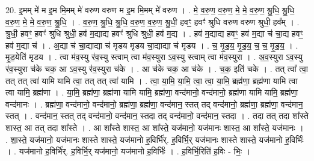 \documentclass[17pt]{extarticle}
\begin{document}
20. इ॒मम् मे॑ म इ॒म मि॒मम् मे॑ वरुण वरुण म इ॒म मि॒मम् मे॑ वरुण । . मे॒ व॒रु॒ण॒ व॒रु॒ण॒ मे॒ मे॒ व॒रु॒ण॒ श्रु॒धि॒ श्रु॒धि॒ व॒रु॒ण॒ मे॒ मे॒ व॒रु॒ण॒ श्रु॒धि॒ । . व॒रु॒ण॒ श्रु॒धि॒ श्रु॒धि॒ व॒रु॒ण॒ व॒रु॒ण॒ श्रु॒धी॒ हवꣳ॒॒ हवꣳ॑ श्रुधि वरुण वरुण श्रुधी॒ हव᳚म् । . श्रु॒धी॒ हवꣳ॒॒ हवꣳ॑ श्रुधि श्रुधी॒ हव॑ म॒द्याद्य हवꣳ॑ श्रुधि श्रुधी॒ हव॑ म॒द्य । . हव॑ म॒द्याद्य हवꣳ॒॒ हव॑ म॒द्या च॑ चा॒द्य हवꣳ॒॒ हव॑ म॒द्या च॑ । . अ॒द्या च॑ चा॒द्याद्या च॑ मृडय मृडय चा॒द्याद्या च॑ मृडय । . च॒ मृ॒ड॒य॒ मृ॒ड॒य॒ च॒ च॒ मृ॒ड॒य॒ । . मृ॒ड॒येति॑ मृडय । . त्वा म॑व॒स्यु र॑व॒स्यु स्त्वाम् त्वा म॑व॒स्युरा ऽव॒स्यु स्त्वाम् त्वा म॑व॒स्युरा । . अ॒व॒स्युरा ऽव॒स्यु र॑व॒स्युरा च॑के चक॒ आ ऽव॒स्यु र॑व॒स्युरा च॑के । . आ च॑के चक॒ आ च॑के । . च॒क॒ इति॑ चके । . तत् त्वा᳚ त्वा॒ तत् तत् त्वा॑ यामि यामि त्वा॒ तत् तत् त्वा॑ यामि । . त्वा॒ या॒मि॒ या॒मि॒ त्वा॒ त्वा॒ या॒मि॒ ब्रह्म॑णा॒ ब्रह्म॑णा यामि त्वा त्वा यामि॒ ब्रह्म॑णा । . या॒मि॒ ब्रह्म॑णा॒ ब्रह्म॑णा यामि यामि॒ ब्रह्म॑णा॒ वन्द॑मानो॒ वन्द॑मानो॒ ब्रह्म॑णा यामि यामि॒ ब्रह्म॑णा॒ वन्द॑मानः । . ब्रह्म॑णा॒ वन्द॑मानो॒ वन्द॑मानो॒ ब्रह्म॑णा॒ ब्रह्म॑णा॒ वन्द॑मान॒ स्तत् तद् वन्द॑मानो॒ ब्रह्म॑णा॒ ब्रह्म॑णा॒ वन्द॑मान॒ स्तत् । . वन्द॑मान॒ स्तत् तद् वन्द॑मानो॒ वन्द॑मान॒ स्तदा तद् वन्द॑मानो॒ वन्द॑मान॒ स्तदा । . तदा तत् तदा शा᳚स्ते शास्त॒ आ तत् तदा शा᳚स्ते । . आ शा᳚स्ते शास्त॒ आ शा᳚स्ते॒ यज॑मानो॒ यज॑मानः शास्त॒ आ शा᳚स्ते॒ यज॑मानः । . शा॒स्ते॒ यज॑मानो॒ यज॑मानः शास्ते शास्ते॒ यज॑मानो ह॒विर्भि॑र्. ह॒विर्भि॒र् यज॑मानः शास्ते शास्ते॒ यज॑मानो ह॒विर्भिः॑ । . यज॑मानो ह॒विर्भि॑र्. ह॒विर्भि॒र् यज॑मानो॒ यज॑मानो ह॒विर्भिः॑ । . ह॒विर्भि॒रिति॑ ह॒विः - भिः॒ । \newline
\end{document}

